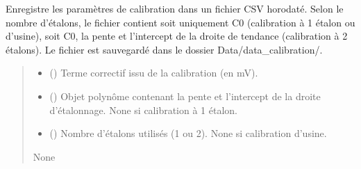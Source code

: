\documentclass[letterpaper,10pt,english]{sphinxmanual}
\begin{document}
\begin{fulllineitems}
\label{\detokenize{calibration:calibration.enregistrement_cal}}
\pysigstartsignatures
\pysiglinewithargsret
{}
{\sphinxparamcomma {}\sphinxparamcomma {}}
{}
\pysigstopsignatures
\sphinxAtStartPar

Enregistre les paramètres de calibration dans un fichier CSV horodaté.
Selon le nombre d’étalons, le fichier contient soit uniquement C0 (calibration
à 1 étalon ou d’usine), soit C0, la pente et l’intercept de la droite de
tendance (calibration à 2 étalons). Le fichier est sauvegardé dans le dossier
Data/data\_calibration/.
\begin{quote}\begin{description}
\begin{itemize}
\item {} 
\sphinxAtStartPar
{} () \textendash{} Terme correctif issu de la calibration (en mV).

\item {} 
\sphinxAtStartPar
{} (\sphinxstyleliteralemphasis{\sphinxupquote{, }}) \textendash{} Objet polynôme contenant la pente et
l’intercept de la droite d’étalonnage. None si calibration à 1 étalon.

\item {} 
\sphinxAtStartPar
{} (\sphinxstyleliteralemphasis{\sphinxupquote{, }}) \textendash{} Nombre d’étalons utilisés (1 ou 2). None si
calibration d’usine.

\end{itemize}

\sphinxAtStartPar
None

\end{description}\end{quote}

\end{fulllineitems}
\end{document}
